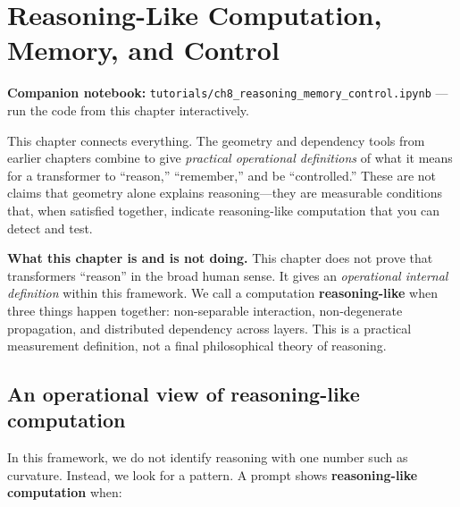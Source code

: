 \documentclass[11pt, twoside, openright]{memoir}
\newcommand{\notebook}[1]{%
  \begin{tcolorbox}[enhanced, colback=LBlue!30, colframe=Blue!60,
    left=4pt, right=4pt, top=3pt, bottom=3pt, boxrule=0.6pt, arc=2pt,
    before skip=6pt, after skip=10pt]
    {\small\sffamily\color{Navy} \textbf{Companion notebook:}
    \texttt{tutorials/#1} --- run the code from this chapter interactively.}
  \end{tcolorbox}%
}
\begin{document}
\chapter{Reasoning-Like Computation, Memory, and Control}
\label{chap:reasoning}

\notebook{ch8\_reasoning\_memory\_control.ipynb}

\begin{whycare}
This chapter connects everything. The geometry and dependency tools from
earlier chapters combine to give \emph{practical operational definitions}
of what it means for a transformer to ``reason,'' ``remember,'' and be
``controlled.'' These are not claims that geometry alone explains
reasoning---they are measurable conditions that, when satisfied together,
indicate reasoning-like computation that you can detect and test.
\end{whycare}

\begin{pitfall}
\textbf{What this chapter is and is not doing.}
This chapter does not prove that transformers ``reason'' in the broad human
sense. It gives an \emph{operational internal definition} within this
framework. We call a computation \textbf{reasoning-like} when three things
happen together: non-separable interaction, non-degenerate propagation, and
distributed dependency across layers. This is a practical measurement
definition, not a final philosophical theory of reasoning.
\end{pitfall}

\section{An operational view of reasoning-like computation}

In this framework, we do not identify reasoning with one number such as
curvature. Instead, we look for a pattern. A prompt shows
\textbf{reasoning-like computation} when:
\end{document}
